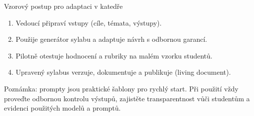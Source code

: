 \medskip
\noindent Vzorový postup pro adaptaci v katedře
\begin{enumerate}
  \item Vedoucí připraví vstupy (cíle, témata, výstupy).
  \item Použije generátor sylabu a adaptuje návrh s odbornou garancí.
  \item Pilotně otestuje hodnocení a rubriky na malém vzorku studentů.
  \item Upravený sylabus verzuje, dokumentuje a publikuje (living document).
\end{enumerate}

\bigskip
\noindent Poznámka: prompty jsou praktické šablony pro rychlý start. Při použití vždy proveďte odbornou kontrolu výstupů, zajistěte transparentnost vůči studentům a evidenci použitých modelů a promptů.